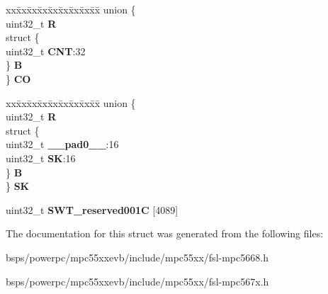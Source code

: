 \begin{DoxyCompactItemize}
\begin{tabbing}
\end{tabbing}\item 
\mbox{\label{structSWT__tag_a359d39abd942dfdead0bc333719dcbe8}} 
\begin{tabbing}
xx\=xx\=xx\=xx\=xx\=xx\=xx\=xx\=xx\=\kill
union \{\\
\>uint32\_t {\bfseries R}\\
\>struct \{\\
\>\>uint32\_t {\bfseries CNT}:32\\
\>\} {\bfseries B}\\
\} {\bfseries CO}\\

\end{tabbing}\item 
\mbox{\label{structSWT__tag_a917c9b629123ddde53007834853c6ce0}} 
\begin{tabbing}
xx\=xx\=xx\=xx\=xx\=xx\=xx\=xx\=xx\=\kill
union \{\\
\>uint32\_t {\bfseries R}\\
\>struct \{\\
\>\>uint32\_t {\bfseries \_\_pad0\_\_}:16\\
\>\>uint32\_t {\bfseries SK}:16\\
\>\} {\bfseries B}\\
\} {\bfseries SK}\\

\end{tabbing}\item 
\mbox{\label{structSWT__tag_a9f21015c7769d09d016effb1001da3c0}} 
uint32\+\_\+t {\bfseries S\+W\+T\+\_\+reserved001C} \mbox{[}4089\mbox{]}
\end{DoxyCompactItemize}


The documentation for this struct was generated from the following files\+:\begin{DoxyCompactItemize}
\item 
bsps/powerpc/mpc55xxevb/include/mpc55xx/fsl-\/mpc5668.\+h\item 
bsps/powerpc/mpc55xxevb/include/mpc55xx/fsl-\/mpc567x.\+h\end{DoxyCompactItemize}
